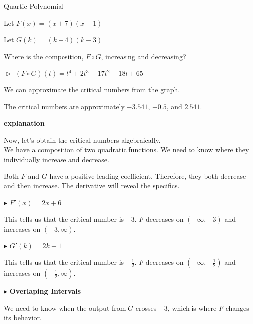 \documentclass{ximera}
\begin{document}
\begin{example}   Quartic Polynomial



Let $F(x) = (x+7)(x-1)$ 


Let $G(k) = (k+4)(k-3)$ 



Where is the composition, $F \circ G$, increasing and decreasing?


$\vartriangleright$   $(F \circ G)(t) = t^4 +2 t^3 -17 t^2 - 18 t + 65$





We can approximate the critical numbers from the graph.



\begin{center}
\end{center}


The critical numbers are approximately $-3.541$, $-0.5$, and $2.541$.


\textbf{\textcolor{red!75!green}{explanation}}


Now, let's obtain the critical numbers algebraically. \\


We have a composition of two quadratic functions.  We need to know where they individually increase and decrease.

Both $F$ and $G$ have a positive leading coefficient.  Therefore, they both decrease and then increase. The derivative will reveal the specifics.



$\blacktriangleright$  $F'(x) = 2x + 6$

This tells us that the critical number is $-3$.  $F$ decreases on $(-\infty, -3)$ and increases on $(-3, \infty)$.

$\blacktriangleright$  $G'(k) = 2k + 1$

This tells us that the critical number is $-\frac{1}{2}$.  $F$ decreases on $(-\infty, -\frac{1}{2})$ and increases on $(-\frac{1}{2}, \infty)$.







\textbf{\textcolor{purple!85!blue}{$\blacktriangleright$}} \textbf{\textcolor{purple!85!blue}{Overlaping Intervals}}  



We need to know when the output from $G$ crosses $-3$, which is where $F$ changes its behavior.






\end{example}
\end{document}
